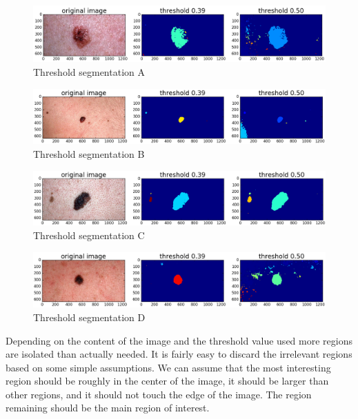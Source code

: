 \begin{figure}[H]
    \includegraphics[width=\textwidth,keepaspectratio]{assets/image_processing/thresholding/figure_01.png}
    \caption{Threshold segmentation A}
    \label{fig:thresh_A}
\end{figure}
\begin{figure}[H]
    \includegraphics[width=\textwidth,keepaspectratio]{assets/image_processing/thresholding/figure_02.png}
    \caption{Threshold segmentation B}
    \label{fig:thresh_B}
\end{figure}
\begin{figure}[H]
    \includegraphics[width=\textwidth,keepaspectratio]{assets/image_processing/thresholding/figure_03.png}
    \caption{Threshold segmentation C}
    \label{fig:thresh_C}
\end{figure}
\begin{figure}[H]
    \includegraphics[width=\textwidth,keepaspectratio]{assets/image_processing/thresholding/figure_04.png}
    \caption{Threshold segmentation D}
    \label{fig:thresh_D}
\end{figure}

Depending on the content of the image and the threshold value used more regions are isolated than actually needed. It is fairly easy to discard the irrelevant regions based on some simple assumptions. We can assume that the most interesting region should be roughly in the center of the image, it should be larger than other regions, and it should not touch the edge of the image. The region remaining should be the main region of interest.

